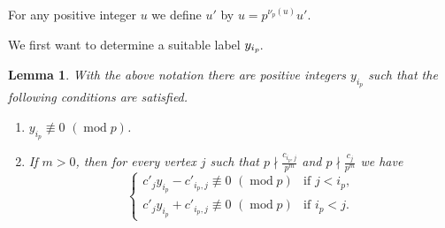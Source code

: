 \documentclass[10pt]{amsart}
\numberwithin{equation}{section}
\newtheorem{lemm}[theo]{Lemma}
\theoremstyle{definition}
\theoremstyle{remark}
\DeclareMathOperator{\md}{mod}
\newcommand*{\Mk}{\mkern -2mu}
\begin{document}
For any positive integer $u$ we define $u'$ by $u=p^{\nu_p(u)} u'$.


We first want to determine a suitable label $y_{i_p}\Mk$. 



\begin{lemm} \label{lem:yip}
With the above notation there are positive integers $y_{i_p}$ such that the following 
conditions are satisfied.
\begin{enumerate}[label=(\roman*)]
\item\label{lemma4.3_i} %
$y_{i_p} \not \equiv 0\,\,(\md p)$.
\item\label{lemma4.3_ii} %
If $m>0$, then for every vertex $j$ such that $p\nmid \frac{c_{i_p,j}}{p^m}$ and $p\nmid \frac{c_{j}}{p^m}$ we have
\begin{equation} \label{eq:ruleout}
\begin{cases} 
c'_j y_{i_p} - c'_{i_p,j}\not \equiv 0\,\,(\md p) &  \mbox{if $j<i_p$}, \\
c'_j y_{i_p} + c'_{i_p,j}\not \equiv 0\,\,(\md p) &  \mbox{if $i_p<j$}.
\end{cases}
\end{equation}
\end{enumerate}
\end{lemm}
\end{document}
